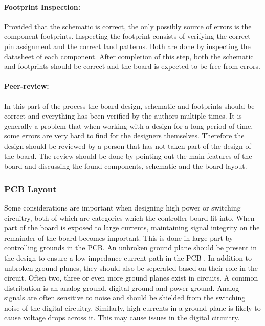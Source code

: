 \paragraph{Footprint Inspection:}
Provided that the schematic is correct, the only possibly source of errors is the component footprints. 
Inspecting the footprint consists of verifying the correct pin assignment and the correct land patterns.
Both are done by inspecting the datasheet of each component. 
After completion of this step, both the schematic and footprints should be correct and the board is expected to be free from errors.

\paragraph{Peer-review:}
In this part of the process the board design, schematic and footprints should be correct and everything has been verified by the authors multiple times.
It is generally a problem that when working with a design for a long period of time, some errors are very hard to find for the designers themselves. 
Therefore the design should be reviewed by a person that has not taken part of the design of the board.
The review should be done by pointing out the main features of the board and discussing the found components, schematic and the board layout.


\subsubsection{PCB Layout} %
Some considerations are important when designing high power or switching circuitry, both of which are categories which the controller board fit into.
When part of the board is exposed to large currents, maintaining signal integrity on the remainder of the board becomes important.
This is done in large part by controlling grounds in the PCB.
An unbroken ground plane should be present in the design to ensure a low-impedance current path in the PCB \cite{pcblayoutds}.
In addition to unbroken ground planes, they should also be seperated based on their role in the circuit.
Often two, three or even more ground planes exist in circuits.
A common distribution is an analog ground, digital ground and power ground.
Analog signals are often sensitive to noise and should be shielded from the switching noise of the digital circuitry.
Similarly, high currents in a ground plane is likely to cause voltage drops across it.
This may cause issues in the digital circuitry.


